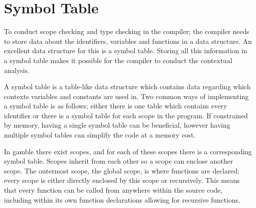 \section{Symbol Table}
To conduct scope checking and type checking in the compiler; the compiler needs to store data about the identifiers, variables and functions in a data structure.
An excellent data structure for this is a symbol table.
Storing all this information in a symbol table makes it possible for the compiler to conduct the contextual analysis.

A symbol table is a table-like data structure which contains data regarding which contexts variables and constants are used in.
Two common ways of implementing a symbol table is as follows; either there is one table which contains every identifier or there is a symbol table for each scope in the program.
If constrained by memory, having a single symbol table can be beneficial, however having multiple symbol tables can simplify the code at a memory cost. 

In \gls{gamble} there exist scopes, and for each of these scopes there is a corresponding symbol table. 
Scopes inherit from each other so a scope can enclose another scope. 
The outermost scope, the global scope, is where functions are declared; every scope is either directly enclosed by this scope or recursively.
This means that every function can be called from anywhere within the source code, including within its own function declarations allowing for recursive functions.

